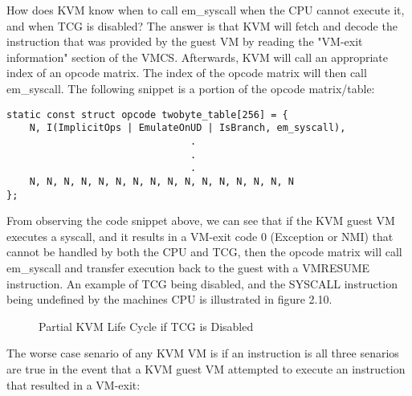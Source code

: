 \documentclass{report}
\begin{document}
\begin{spacing}{1.5}
{\large
How does KVM know when to call em\_syscall when the CPU cannot execute it, and when TCG is disabled? The answer is that KVM will fetch and decode the instruction that was provided by the guest VM by reading the "VM-exit information" section of the VMCS. Afterwards, KVM will call an appropriate index of an opcode matrix. The index of the opcode matrix will then call em\_syscall. The following snippet is a portion of the opcode matrix/table:
\newline
}





\begin{lstlisting}[caption={/arch/x86/kvm/emulate.c:2712 | Linux kernel V5.18.8},captionpos=b]
static const struct opcode twobyte_table[256] = {
    N, I(ImplicitOps | EmulateOnUD | IsBranch, em_syscall),
                                .
                                .
                                .
    N, N, N, N, N, N, N, N, N, N, N, N, N, N, N, N
};
\end{lstlisting}


From observing the code snippet above, we can see that if the KVM guest VM executes a syscall, and it results in a VM-exit code 0 (Exception or NMI) that cannot be handled by both the CPU and TCG, then the opcode matrix will call em\_syscall and transfer execution back to the guest with a VMRESUME instruction. An example of TCG being disabled, and the SYSCALL instruction being undefined by the machines CPU is illustrated in figure 2.10.


\newpage
\vfill
{}
\begin{figure}[ht]
    \centering
    \caption{Partial KVM Life Cycle if TCG is Disabled}
\end{figure}




{\large
The worse case senario of any KVM VM is if an instruction is all three senarios are true in the event that a KVM guest VM attempted to execute an instruction that resulted in a VM-exit:

}
\end{spacing}
\end{document}
